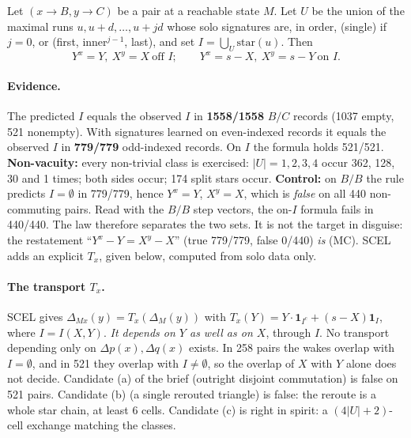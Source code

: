 \documentclass[11pt]{article}
\theoremstyle{definition}\newtheorem{definition}[theorem]{Definition}\newtheorem{remark}[theorem]{Remark}
\begin{document}
\begin{conjecture}\label{conj:scel}
Let $(x\to B,y\to C)$ be a pair at a reachable state $M$. Let $U$ be the union of the maximal runs $u,u+d,\dots,u+jd$ whose solo signatures are, in order,
(single) if $j=0$, or (first, inner$^{j-1}$, last), and set $I=\bigcup_U\mathrm{star}(u)$. Then
\[Y^x=Y,\ X^y=X\ \text{off }I;\qquad Y^x=s-X,\ X^y=s-Y\ \text{on }I.\]
\end{conjecture}
\paragraph{Evidence.} The predicted $I$ equals the observed $I$ in \textbf{1558/1558} $B/C$ records (1037 empty, 521 nonempty). With signatures learned on even-indexed
records it equals the observed $I$ in \textbf{779/779} odd-indexed records. On $I$ the formula holds 521/521. \textbf{Non-vacuity:} every non-trivial class is exercised:
$|U|=1,2,3,4$ occur 362, 128, 30 and 1 times; both sides occur; 174 split stars occur.
\textbf{Control:} on $B/B$ the rule predicts $I=\emptyset$ in 779/779, hence $Y^x=Y$, $X^y=X$, which is \emph{false} on all 440 non-commuting pairs. Read
with the $B/B$ step vectors, the on-$I$ formula fails in 440/440. The law therefore separates the two sets. It is not the target in disguise: the restatement
``$Y^x-Y=X^y-X$'' (true 779/779, false 0/440) \emph{is} (MC). SCEL adds an explicit $T_x$, given below, computed from solo data only.

\paragraph{The transport $T_x$.} SCEL gives $\Delta_{Mx}(y)=T_x(\Delta_M(y))$ with $T_x(Y)=Y\cdot\mathbf 1_{I^c}+(s-X)\mathbf 1_I$, where $I=I(X,Y)$.
\emph{It depends on $Y$ as well as on $X$}, through $I$. No transport depending only on $\Delta p(x),\Delta q(x)$ exists. In 258 pairs the wakes overlap with $I=\emptyset$, and in 521 they overlap with
$I\ne\emptyset$, so the overlap of $X$ with $Y$ alone does not decide. Candidate (a) of the brief (outright disjoint commutation) is false on 521 pairs.
Candidate (b) (a single rerouted triangle) is false: the reroute is a whole star chain, at least 6 cells. Candidate (c) is right in spirit: a $(4|U|+2)$-cell exchange matching the classes.
\end{document}
